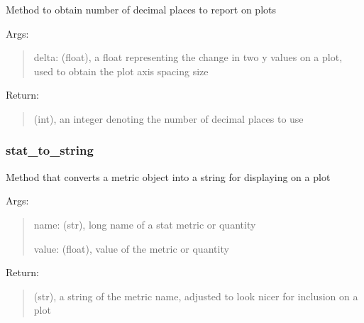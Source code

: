 \documentclass[letterpaper,10pt,english]{sphinxmanual}
\begin{document}
\begin{fulllineitems}
\label{\detokenize{api/mastml.plots.rounder:mastml.plots.rounder}}
Method to obtain number of decimal places to report on plots

Args:
\begin{quote}

delta: (float), a float representing the change in two y values on a plot, used to obtain the plot axis spacing size
\end{quote}

Return:
\begin{quote}

(int), an integer denoting the number of decimal places to use
\end{quote}

\end{fulllineitems}



\subsubsection{stat\_to\_string}
\label{\detokenize{api/mastml.plots.stat_to_string:stat-to-string}}\label{\detokenize{api/mastml.plots.stat_to_string::doc}}

\begin{fulllineitems}
\label{\detokenize{api/mastml.plots.stat_to_string:mastml.plots.stat_to_string}}
Method that converts a metric object into a string for displaying on a plot

Args:
\begin{quote}

name: (str), long name of a stat metric or quantity

value: (float), value of the metric or quantity
\end{quote}

Return:
\begin{quote}

(str), a string of the metric name, adjusted to look nicer for inclusion on a plot
\end{quote}

\end{fulllineitems}
\end{document}
